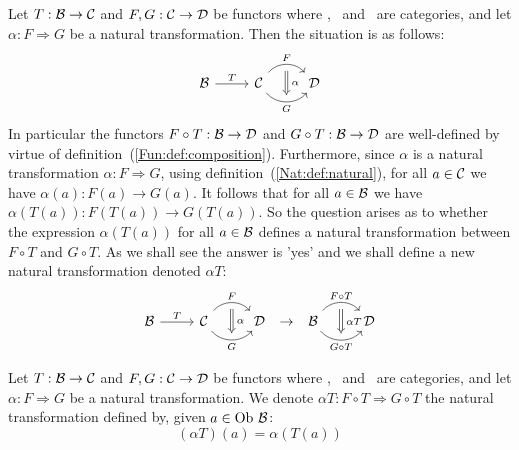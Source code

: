 Let $T:\mbox{$\cal B$}\to\mbox{$\cal C$}$ and $F,G:\mbox{$\cal C$}\to\mbox{$\cal D$}$ be functors where \Bat, \Cat\
and \Dat\ are categories, and let $\alpha:F\Rightarrow G$ be a natural 
transformation. Then the situation is as follows: 
    \[
        \begin{tikzcd}
            \Bat \arrow[r,"T"]
            & \Cat \arrow[r, "F", bend left  = 50, ""{name=U, below}]
                 \arrow[r, swap, "G", bend right = 50, ""{name=D, above}]
              & \Dat
            \arrow[Rightarrow, "\,\alpha", from = U, to = D]
        \end{tikzcd}
    \] 
In particular the functors $F\circ T:\mbox{$\cal B$}\to\mbox{$\cal D$}$ and $G\circ T:\mbox{$\cal B$}\to\mbox{$\cal D$}$
are well-defined by virtue of definition~(\ref{Fun:def:composition}).
Furthermore, since $\alpha$ is a natural transformation $\alpha:F\Rightarrow G$,
using definition~(\ref{Nat:def:natural}), for all $a\in\mbox{$\cal C$}$ we have 
$\alpha(a):F(a)\to G(a)$. It follows that for all $a\in\mbox{$\cal B$}$ we have 
$\alpha (T(a)) : F(T(a))\to G(T(a))$. So the question arises as to whether
the expression $\alpha(T(a))$ for all $a\in\mbox{$\cal B$}$ defines a natural
transformation between $F\circ T$ and $G\circ T$. As we shall see the 
answer is 'yes' and we shall define a new natural transformation denoted 
$\alpha T$:
    \[
        \begin{tikzcd}
            \Bat \arrow[r,"T"]
            & \Cat \arrow[r, "F", bend left  = 50, ""{name=U, below}]
                 \arrow[r, swap, "G", bend right = 50, ""{name=D, above}]
              & \Dat
            \arrow[Rightarrow, "\,\alpha", from = U, to = D]
        \end{tikzcd}
        \ \to\ 
        \begin{tikzcd}
            \Bat \arrow[r, "F\circ T", bend left  = 50, ""{name=U, below}]
                 \arrow[r, swap, "G\circ T", bend right = 50, ""{name=D, above}]
              & \Dat
            \arrow[Rightarrow, "\,\alpha T", from = U, to = D]
        \end{tikzcd}
    \]

\begin{defin}\label{Nat:def:rightmul}
    Let $T:\mbox{$\cal B$}\to\mbox{$\cal C$}$ and $F,G:\mbox{$\cal C$}\to\mbox{$\cal D$}$ be functors where \Bat, \Cat\
    and \Dat\ are categories, and let $\alpha:F\Rightarrow G$ be a natural 
    transformation. We denote $\alpha T: F\circ T\Rightarrow G\circ T$ the 
    natural transformation defined by, given $a\in\mbox{\rm Ob}\ \mbox{$\cal B$}$:
        \[
            (\alpha T)(a) = \alpha (T(a))
        \]
\end{defin}  

